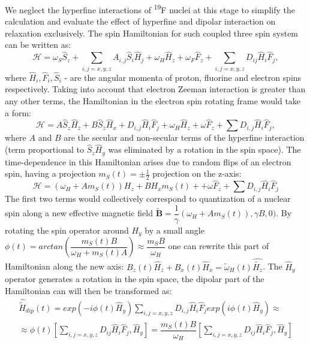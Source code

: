 \documentclass[a4paper, 12pt]{article}
\begin{document}
 We neglect the hyperfine interactions of \textsuperscript{19}F nuclei at this stage to simplify the calculation and evaluate the effect of hyperfine and dipolar interaction on relaxation exclusively. The spin Hamiltonian for such coupled three spin system can be written as: 
\begin{equation}
\mathcal{H} =  \omega_S \hat{S}_z + \sum_{i,j=x,y,z} A_{i,j} \hat{S}_i \hat{H}_j + \omega_H \hat{H}_z + \omega_F \hat{F}_z + \sum_{i,j=x,y,z} D_{ij} \hat{H}_i \hat{F}_j,
\end{equation}
where $\hat{H}_i, \hat{F}_i, \hat{S}_i$ - are the angular momenta of proton, fluorine and electron spins respectively. Taking into account that electron Zeeman interaction is greater than any other terms, the Hamiltonian in the electron spin rotating frame would take a form:
\begin{equation}
  \mathcal{H}  = A \hat{S}_z \hat{H}_z + B \hat{S}_z \hat{H}_x + D_{i,j} \hat{H}_i \hat{F}_j +  \omega_H \hat{H}_z + \omega \hat{F}_z + \sum D_{i,j} \hat{H}_i \hat{F}_j,
\end{equation}
where $A$ and $B$ are the secular and non-secular terms of the hyperfine interaction (term proportional to $\hat{S}_z \hat{H}_y$ was eliminated by a rotation in the spin space). The time-dependence in this Hamiltonian arises due to random flips of an electron spin, having a projection $m_S(t)=\pm \frac{1}{2}$ projection on the z-axis:
\begin{equation}
\mathcal{H} = (\omega_H + A m_S(t)) H_z + B H_x m_S(t) + + \omega \hat{F}_z + \sum D_{i,j} \hat{H}_i \hat{F}_j
\end{equation}
The first two terms would collectively correspond to quantization of a nuclear spin along a new effective magnetic field $\tilde{\mathbf{B}}=\dfrac{1}{\gamma}(\omega_H + A m_S(t)), \gamma B, 0)$. By rotating the spin operator around $H_y$ by a small angle $\phi(t)= arctan(\dfrac{m_S(t)B}{\omega_H + m_S(t) A} )  \approx \dfrac{m_S B}{\omega_H}$ one can rewrite this part of Hamiltonian along the new axis: $B_z(t) \hat{H}_z + B_x(t) \hat{H}_x = \tilde{\omega}_H(t) \hat{\tilde{H_z}}$. The $\hat{H}_y$ operator generates a rotation in the spin space, the dipolar part of the Hamiltonian can will then be transformed as:
\begin{equation}
\begin{array}{cc}
 \hat{\tilde{H}}_{dip} (t) =  exp(-i \phi(t) \hat{H}_y) \sum\limits_{i,j=x,y,z} D_{i,j} \hat{H}_i \hat{F}_j exp(i \phi(t) \hat{H}_y)  \approx  \\
\approx \phi(t)[ \sum \limits_{i,j=x,y,z} D_{ij} \hat{H}_i \hat{F}_j, \hat{H}_y] = \dfrac{m_S(t) B}{\omega_H} [ \sum \limits_{i,j=x,y,z} D_{ij} \hat{H}_i \hat{F}_j, \hat{H}_y]
\end{array}
\end{equation}
\end{document}
